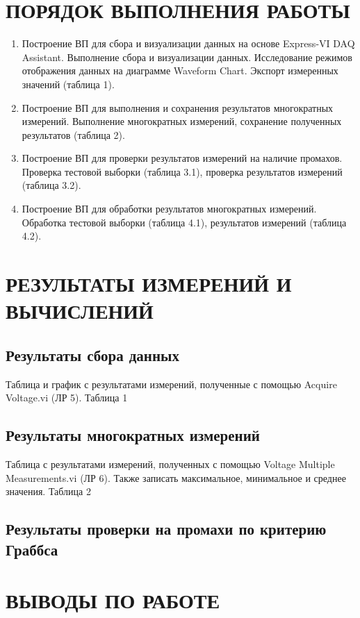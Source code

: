 \documentclass[a4paper,14pt]{article}
\begin{document}
\section{ПОРЯДОК ВЫПОЛНЕНИЯ РАБОТЫ}
\begin{enumerate}
\item     Построение ВП для сбора и визуализации данных на основе Express-VI DAQ Assistant.
 Выполнение сбора и визуализации данных.
 Исследование режимов отображения данных на диаграмме Waveform Chart.
 Экспорт измеренных значений (таблица 1).
\item     Построение ВП для выполнения и сохранения результатов многократных измерений.
 Выполнение многократных измерений, сохранение полученных результатов (таблица 2).
\item     Построение ВП для проверки результатов измерений на наличие промахов.
Проверка тестовой выборки (таблица 3.1), проверка результатов измерений (таблица  3.2).
\item     Построение ВП для обработки результатов многократных измерений.
Обработка тестовой выборки (таблица 4.1), результатов измерений (таблица 4.2).
\end{enumerate}

\section{ РЕЗУЛЬТАТЫ ИЗМЕРЕНИЙ И ВЫЧИСЛЕНИЙ}

\subsection{Результаты сбора данных}
Таблица и график с результатами измерений, полученные с помощью Acquire Voltage.vi (ЛР 5).
Таблица 1
\subsection{Результаты многократных измерений}

Таблица с результатами измерений, полученных с помощью Voltage Multiple Measurements.vi (ЛР 6). Также записать максимальное, минимальное и среднее значения.
Таблица 2
\subsection{Результаты проверки на промахи по критерию Граббса}

\section{ВЫВОДЫ ПО РАБОТЕ}
\end{document}
